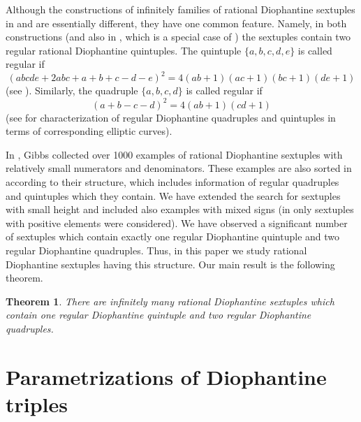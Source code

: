 \documentclass[a4paper]{amsart}
\theoremstyle{plain}
\newtheorem{theorem}{Theorem}
\theoremstyle{definition}
\begin{document}
Although the constructions of infinitely families of rational Diophantine sextuples
in \cite{Duje-Matija} and \cite{DKMS} are essentially different,
they have one common feature. Namely, in both constructions
(and also in \cite{DKP-sext}, which is a special case of \cite{Duje-Matija})
the sextuples contain two regular rational Diophantine quintuples.
The quintuple $\{a,b,c,d,e\}$ is called regular if
$$ (abcde+2abc+a+b+c-d-e)^2=4(ab+1)(ac+1)(bc+1)(de+1) $$
(see \cite{duje-quint,duje-irr,duje-sext,G2}). Similarly, the quadruple $\{a,b,c,d\}$ is called regular if
$$ (a+b-c-d)^2=4(ab+1)(cd+1) $$
(see \cite{duje-irr} for characterization of regular Diophantine quadruples and quintuples
in terms of corresponding elliptic curves).

In \cite{G3}, Gibbs collected over 1000 examples of rational Diophantine sextuples with relatively
small numerators and denominators. These examples are also sorted in \cite{G3} according to their
structure, which includes information of regular quadruples and quintuples which they contain.
We have extended the search for sextuples with small height and included also examples
with mixed signs (in \cite{G3} only sextuples with positive elements were considered).
We have observed a significant number of sextuples which contain
exactly one regular Diophantine quintuple and two regular Diophantine quadruples.
Thus, in this paper we study rational Diophantine sextuples having this structure.
Our main result is the following theorem.

\begin{theorem} \label{tm1}
There are infinitely many rational Diophantine sextuples which contain one regular Diophantine quintuple
and two regular Diophantine quadruples.
\end{theorem}

\section{Parametrizations of Diophantine triples} \label{sec:triples}
\end{document}
